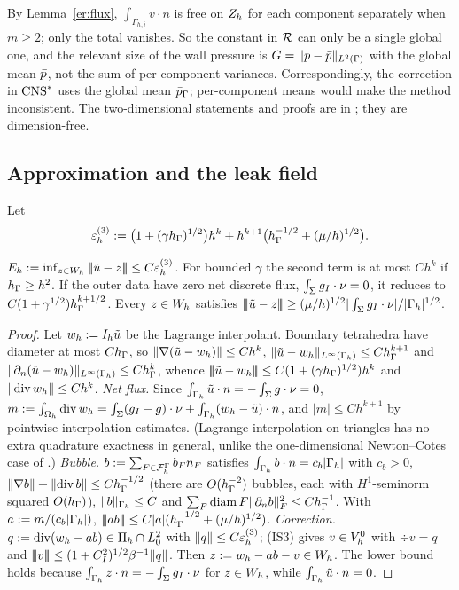 \begin{remark}\label{er:rem:global}
By Lemma~\ref{er:flux}, $\int_{\Gamma_{h,i}}v\cdot n$ is free on $Z_h$ for each component separately when $m\ge2$; only the total vanishes. So the constant in $\mathcal R$ can only be a single global one, and the relevant size of the wall pressure is $G=\lVert p-\bar p\rVert_{L^2(\Gamma)}$ with the global mean $\bar p$, not the sum of per-component variances. Correspondingly, the correction in $\mathrm{CNS}^\ast$ uses the global mean $\bar p_{\Gamma}$; per-component means would make the method inconsistent. The two-dimensional statements and proofs are in \cite{PadhiLong2D}; they are dimension-free.
\end{remark}

\subsection{Approximation and the leak field}

Let
\[
\varepsilon_h^{(3)}:=\bigl(1+(\gamma h_\Gamma)^{1/2}\bigr)h^k+h^{k+1}\bigl(h_\Gamma^{-1/2}+(\mu/h)^{1/2}\bigr).
\]

\begin{lemma}[Approximation in $\Wh$]\label{er:approx}
$E_h:=\inf_{z\in W_h}|\!|\!|\tilde u-z|\!|\!|\le C\varepsilon_h^{(3)}$. For bounded $\gamma$ the second term is at most $Ch^k$ if $h_\Gamma\ge h^2$. If the outer data have zero net discrete flux, $\int_\Sigma g_I\cdot\nu=0$, it reduces to $C(1+\gamma^{1/2})h_\Gamma^{k+1/2}$. Every $z\in W_h$ satisfies $|\!|\!|\tilde u-z|\!|\!|\ge(\mu/h)^{1/2}|\int_\Sigma g_I\cdot\nu|/|\Gamma_h|^{1/2}$.
\end{lemma}

\begin{proof}
Let $w_h:=I_h\tilde u$ be the Lagrange interpolant. Boundary tetrahedra have diameter at most $Ch_\Gamma$, so $\lVert \nabla(\tilde u-w_h)\rVert\le Ch^k$, $\lVert \tilde u-w_h\rVert_{L^\infty(\Gamma_h)}\le Ch_\Gamma^{k+1}$ and $\lVert \partial_n(\tilde u-w_h)\rVert_{L^\infty(\Gamma_h)}\le Ch_\Gamma^k$, whence $|\!|\!|\tilde u-w_h|\!|\!|\le C(1+(\gamma h_\Gamma)^{1/2})h^k$ and $\lVert \operatorname{div} w_h\rVert\le Ch^k$.
\emph{Net flux.} Since $\int_{\Gamma_h}\tilde u\cdot n=-\int_\Sigma g\cdot\nu=0$, $m:=\int_{\Omega_h}\operatorname{div} w_h=\int_\Sigma(g_I-g)\cdot\nu+\int_{\Gamma_h}(w_h-\tilde u)\cdot n$, and $|m|\le Ch^{k+1}$ by pointwise interpolation estimates. (Lagrange interpolation on triangles has no extra quadrature exactness in general, unlike the one-dimensional Newton--Cotes case of \cite{PadhiLong2D}.)
\emph{Bubble.} $b:=\sum_{F\in\mathcal F_h^\Gamma}b_Fn_F$ satisfies $\int_{\Gamma_h}b\cdot n=c_b|\Gamma_h|$ with $c_b>0$, $\lVert \nabla b\rVert+\lVert \operatorname{div} b\rVert\le Ch_\Gamma^{-1/2}$ (there are $O(h_\Gamma^{-2})$ bubbles, each with $H^1$-seminorm squared $O(h_\Gamma)$), $\lVert b\rVert_{\Gamma_h}\le C$ and $\sum_F\operatorname{diam} F\lVert \partial_n b\rVert^2_F\le Ch_\Gamma^{-1}$. With $a:=m/(c_b|\Gamma_h|)$, $|\!|\!|ab|\!|\!|\le C|a|(h_\Gamma^{-1/2}+(\mu/h)^{1/2})$.
\emph{Correction.} $q:=\operatorname{div}(w_h-ab)\in\Pi_h\cap L^2_0$ with $\lVert q\rVert\le C\varepsilon_h^{(3)}$; (IS3) gives $v\in V_h^0$ with $\div v=q$ and $|\!|\!|v|\!|\!|\le(1+C_I^2)^{1/2}\beta^{-1}\lVert q\rVert$. Then $z:=w_h-ab-v\in W_h$. The lower bound holds because $\int_{\Gamma_h}z\cdot n=-\int_\Sigma g_I\cdot\nu$ for $z\in W_h$, while $\int_{\Gamma_h}\tilde u\cdot n=0$.
\end{proof}

